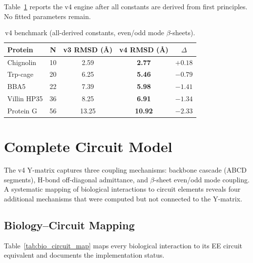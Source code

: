 Table~\ref{tab:v4_benchmark} reports the v4 engine after
all constants are derived from first principles.
No fitted parameters remain.

\begin{table}[H]
\centering
\caption{v4 benchmark (all-derived constants, even/odd mode $\beta$-sheets).}
\label{tab:v4_benchmark}
\begin{tabular}{l c c c c}
\toprule
Protein & N & v3 RMSD (\AA) & v4 RMSD (\AA) & $\Delta$ \\
\midrule
Chignolin    & 10 & 2.59          & \textbf{2.77}  & $+0.18$ \\
Trp-cage     & 20 & 6.25          & \textbf{5.46}  & $-0.79$ \\
BBA5         & 22 & 7.39          & \textbf{5.98}  & $-1.41$ \\
Villin HP35  & 36 & 8.25          & \textbf{6.91}  & $-1.34$ \\
Protein G    & 56 & 13.25         & \textbf{10.92} & $-2.33$ \\
\bottomrule
\end{tabular}
\end{table}

\section{Complete Circuit Model}
\label{sec:complete_circuit}

The v4 Y-matrix captures three coupling mechanisms: backbone
cascade (ABCD segments), H-bond off-diagonal admittance, and
$\beta$-sheet even/odd mode coupling.  A systematic mapping of
biological interactions to circuit elements reveals four additional
mechanisms that were computed but not connected to the Y-matrix.

\subsection{Biology--Circuit Mapping}
\label{sec:bio_circuit_map}

Table~\ref{tab:bio_circuit_map} maps every biological interaction
to its EE circuit equivalent and documents the implementation status.

